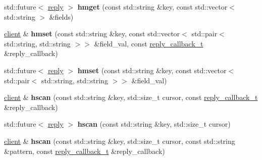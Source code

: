 \begin{DoxyCompactItemize}
\item 
\mbox{\label{classcpp__redis_1_1client_a8e3af68988204e491ada35efaaf9b247}} 
std\+::future$<$ \mbox{\hyperlink{classcpp__redis_1_1reply}{reply}} $>$ {\bfseries hmget} (const std\+::string \&key, const std\+::vector$<$ std\+::string $>$ \&fields)
\item 
\mbox{\label{classcpp__redis_1_1client_a8c5f96c6e663d89aa18baba495872cfb}} 
\mbox{\hyperlink{classcpp__redis_1_1client}{client}} \& {\bfseries hmset} (const std\+::string \&key, const std\+::vector$<$ std\+::pair$<$ std\+::string, std\+::string $>$$>$ \&field\+\_\+val, const \mbox{\hyperlink{classcpp__redis_1_1client_af7a65eb21aa25230bfbb0b0203c4fc04}{reply\+\_\+callback\+\_\+t}} \&reply\+\_\+callback)
\item 
\mbox{\label{classcpp__redis_1_1client_acbb8d8fa40a64a155e19e49aae12f117}} 
std\+::future$<$ \mbox{\hyperlink{classcpp__redis_1_1reply}{reply}} $>$ {\bfseries hmset} (const std\+::string \&key, const std\+::vector$<$ std\+::pair$<$ std\+::string, std\+::string $>$$>$ \&field\+\_\+val)
\item 
\mbox{\label{classcpp__redis_1_1client_a982be06bd7f06cad392453697980b49e}} 
\mbox{\hyperlink{classcpp__redis_1_1client}{client}} \& {\bfseries hscan} (const std\+::string \&key, std\+::size\+\_\+t cursor, const \mbox{\hyperlink{classcpp__redis_1_1client_af7a65eb21aa25230bfbb0b0203c4fc04}{reply\+\_\+callback\+\_\+t}} \&reply\+\_\+callback)
\item 
\mbox{\label{classcpp__redis_1_1client_ab5d944206bf5be886be130ab5e341219}} 
std\+::future$<$ \mbox{\hyperlink{classcpp__redis_1_1reply}{reply}} $>$ {\bfseries hscan} (const std\+::string \&key, std\+::size\+\_\+t cursor)
\item 
\mbox{\label{classcpp__redis_1_1client_a493ce9060e1cd4424d892ade5aab4513}} 
\mbox{\hyperlink{classcpp__redis_1_1client}{client}} \& {\bfseries hscan} (const std\+::string \&key, std\+::size\+\_\+t cursor, const std\+::string \&pattern, const \mbox{\hyperlink{classcpp__redis_1_1client_af7a65eb21aa25230bfbb0b0203c4fc04}{reply\+\_\+callback\+\_\+t}} \&reply\+\_\+callback)
\item 

\end{DoxyCompactItemize}
